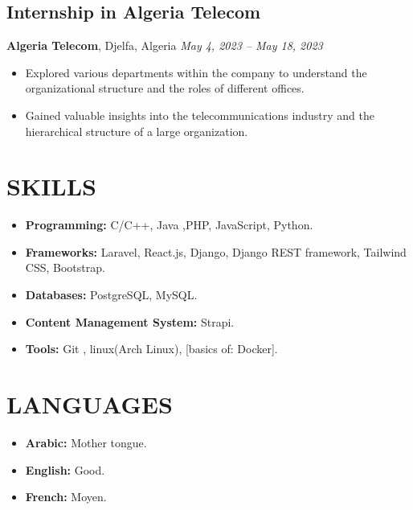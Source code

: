 \documentclass[a4paper,12pt]{article}
\begin{document}
\subsection*{Internship in Algeria Telecom}
\textbf{Algeria Telecom}, Djelfa, Algeria \hfil
\textit{May 4, 2023 – May 18, 2023} \\
\begin{itemize}
    \item Explored various departments within the company to understand the organizational structure and the roles of different offices.
    \item Gained valuable insights into the telecommunications industry and the hierarchical structure of a large organization.
\end{itemize}

\section{SKILLS}
\begin{itemize}
    \itemsep=-.3em
    \item \textbf{Programming:} C/C++, Java ,PHP, JavaScript, Python.
    \item \textbf{Frameworks:} Laravel, React.js, Django, Django REST framework, Tailwind CSS, Bootstrap.
    \item \textbf{Databases:} PostgreSQL, MySQL.
    \item \textbf{Content Management System:} Strapi.
    \item \textbf{Tools:} Git , linux(Arch Linux),  [basics of: Docker].
\end{itemize}

\section{LANGUAGES}
\begin{itemize}
    \itemsep=-.3em
    \item \textbf{Arabic:} Mother tongue.
    \item \textbf{English:} Good.
    \item \textbf{French:} Moyen.
\end{itemize}
\end{document}
